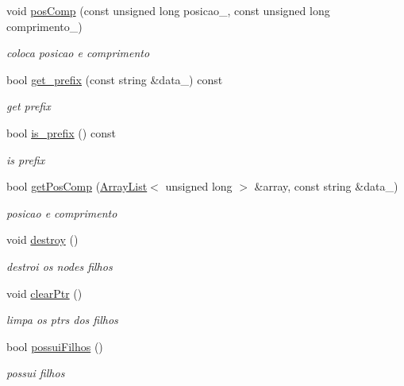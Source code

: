 \begin{DoxyCompactItemize}
void \mbox{\hyperlink{structstructures_1_1Trie_1_1Node_ac02c6075d025bb80148c2888954194fb}{pos\+Comp}} (const unsigned long posicao\+\_\+, const unsigned long comprimento\+\_\+)
\begin{DoxyCompactList}\small\item\em coloca posicao e comprimento \end{DoxyCompactList}\item 
bool \mbox{\hyperlink{structstructures_1_1Trie_1_1Node_a28f32c5d84cda1d3e0ecd31dcc5220a7}{get\+\_\+prefix}} (const string \&data\+\_\+) const
\begin{DoxyCompactList}\small\item\em get prefix \end{DoxyCompactList}\item 
bool \mbox{\hyperlink{structstructures_1_1Trie_1_1Node_a4424baa5147ca5841e2d2183979f5def}{is\+\_\+prefix}} () const
\begin{DoxyCompactList}\small\item\em is prefix \end{DoxyCompactList}\item 
bool \mbox{\hyperlink{structstructures_1_1Trie_1_1Node_a206815fbb1be0496007790134262c13a}{get\+Pos\+Comp}} (\mbox{\hyperlink{classstructures_1_1ArrayList}{Array\+List}}$<$ unsigned long $>$ \&array, const string \&data\+\_\+)
\begin{DoxyCompactList}\small\item\em posicao e comprimento \end{DoxyCompactList}\item 
void \mbox{\hyperlink{structstructures_1_1Trie_1_1Node_a3e7681ab1eed7b58db5fd33ef4a59e6d}{destroy}} ()
\begin{DoxyCompactList}\small\item\em destroi os nodes filhos \end{DoxyCompactList}\item 
void \mbox{\hyperlink{structstructures_1_1Trie_1_1Node_a9dee0e2ff6479a672187866cd9bb70a8}{clear\+Ptr}} ()
\begin{DoxyCompactList}\small\item\em limpa os ptrs dos filhos \end{DoxyCompactList}\item 
bool \mbox{\hyperlink{structstructures_1_1Trie_1_1Node_a39d23e7e387688f1f0938fc311a04707}{possui\+Filhos}} ()
\begin{DoxyCompactList}\small\item\em possui filhos \end{DoxyCompactList}\end{DoxyCompactItemize}


